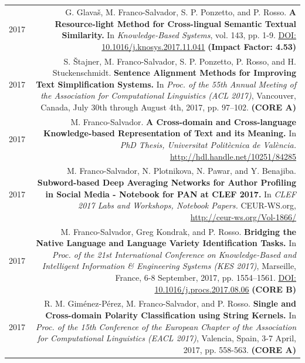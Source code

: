 \documentclass[10pt]{article}
\begin{document}
\section*{}
\begin{tabular}{L!{\VRule}R}
	2017 & G. Glava{\v s}, M. Franco-Salvador, S. P. Ponzetto, and P. Rosso. \textbf{A Resource-light Method for Cross-lingual Semantic Textual Similarity.}
	In \emph{Knowledge-Based Systems}, vol. 143, pp. 1-9. \href{https://doi.org/10.1016/j.knosys.2017.11.041}{DOI: 10.1016/j.knosys.2017.11.041} \textbf{(Impact Factor: 4.53)} \vspace{5pt}\\	
	2017& S. \v{S}tajner, M. Franco-Salvador, S. P. Ponzetto, P. Rosso, and H. Stuckenschmidt. \textbf{Sentence Alignment Methods for Improving Text Simplification Systems.}
	In \emph{Proc. of the 55th Annual Meeting of the Association for Computational Linguistics (ACL 2017)},  Vancouver, Canada, July 30th through August 4th, 2017, pp. 97--102. \textbf{(CORE A)}\vspace{5pt}\\
	2017& M. Franco-Salvador. \textbf{A Cross-domain and Cross-language Knowledge-based Representation of Text and its Meaning.}
	In \emph{PhD Thesis, Universitat Polit{\`e}cnica de Val{\`e}ncia.} \href{http://hdl.handle.net/10251/84285}{http://hdl.handle.net/10251/84285}\vspace{5pt}\\
	2017& M. Franco-Salvador, N. Plotnikova, N. Pawar, and Y. Benajiba. \textbf{Subword-based Deep Averaging Networks for Author Profiling in Social Media - Notebook for PAN at CLEF 2017.}
	In \emph{CLEF 2017 Labs and Workshops, Notebook Papers.} CEUR-WS.org, \href{http://ceur-ws.org/Vol-1866/}{http://ceur-ws.org/Vol-1866/} \vspace{5pt}\\
	2017&M. Franco-Salvador, Greg Kondrak, and P. Rosso. \textbf{Bridging the Native Language and Language Variety Identification Tasks.}
	In \emph{Proc. of the 21st International Conference on Knowledge-Based and Intelligent Information \& Engineering Systems (KES 2017)}, Marseille, France, 6-8 September, 2017, pp. 1554--1561. \href{https://doi.org/10.1016/j.procs.2017.08.068}{DOI: 10.1016/j.procs.2017.08.06} \textbf{(CORE B)}\vspace{5pt}\\
	2017&R. M. Gim{\'e}nez-P{\'e}rez, M. Franco-Salvador, and P. Rosso. \textbf{Single and Cross-domain Polarity Classification using String Kernels.}
	In \emph{Proc. of the 15th Conference of the European Chapter of the Association for Computational Linguistics (EACL 2017)}, Valencia, Spain, 3-7 April, 2017, pp. 558-563. \textbf{(CORE A)}\vspace{5pt}\\

\end{tabular}
\end{document}
